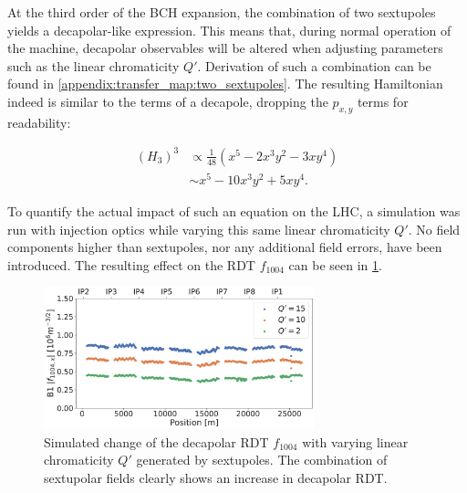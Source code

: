 \FloatBarrier
\subsubsection{}

At the third order of the BCH expansion, the combination of two sextupoles yields a decapolar-like
expression. This means that, during normal operation of the machine, decapolar observables will be
altered when adjusting parameters such as the linear chromaticity $Q'$. 
Derivation of such a combination can be found in \cref{appendix:transfer_map:two_sextupoles}. The
resulting Hamiltonian indeed is similar to the terms of a decapole, dropping the $p_{x,y}$ terms for
readability:

\begin{equation}
    \begin{aligned}
         (H_3)^3 &\propto \frac{1}{48} \left(x^5 - 2x^3y^2 - 3xy^4 \right)\\
                 &\sim    x^5 - 10x^3y^2 + 5xy^4.
    \end{aligned}
    \label{eq:decapoles:sextupoles_b5}
\end{equation}

To quantify the actual impact of such an equation on the LHC, a simulation was run with injection
optics while varying this same linear chromaticity $Q'$. No field components higher than
sextupoles, nor any additional field errors, have been introduced. The resulting effect on the RDT
$f_{1004}$ can be seen in \cref{fig:decapoles:rdts:simulated_f1004_from_sextupoles}.


\begin{figure}[H]
    \centering
    \includegraphics[width=0.7\textwidth]{./images/f1004/f1004_dq.pdf}
    \caption{Simulated change of the decapolar RDT $f_{1004}$ with varying linear
    chromaticity $Q'$ generated by sextupoles. The combination of sextupolar fields clearly shows an 
    increase in decapolar RDT.}
    \label{fig:decapoles:rdts:simulated_f1004_from_sextupoles}
\end{figure}

